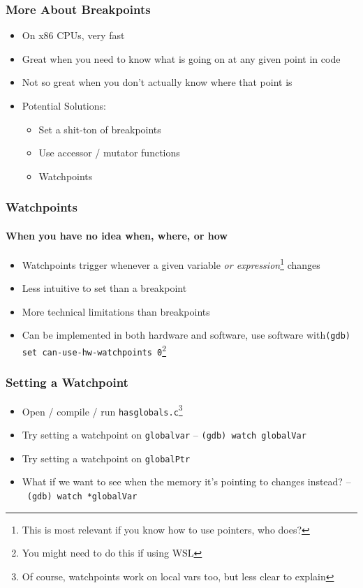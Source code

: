 \documentclass[aspectratio=169]{beamer}
\newcommand{\code}{\texttt}
\begin{document}
\begin{frame}
    \frametitle{More About Breakpoints}

    \begin{itemize}
        \item On x86 CPUs, very fast
        \item Great when you need to know what is going on at any given point in code
        \pause
        \item Not so great when you don't actually know where that point is
        \item Potential Solutions:
        \begin{itemize}
            \pause
            \item Set a shit-ton of breakpoints
            \item Use accessor / mutator functions
            \item Watchpoints
        \end{itemize}
    \end{itemize}

\end{frame}
\begin{frame}
    \frametitle{Watchpoints}
    \framesubtitle{When you have no idea when, where, or how}
    \begin{itemize}
        \item Watchpoints trigger whenever a given variable \textit{or expression}\footnote[frame]{This is most relevant if you know how to use pointers, who does?} changes
        \item Less intuitive to set than a breakpoint
        \item More technical limitations than breakpoints
        \item Can be implemented in both hardware and software, use software with\linebreak\code{(gdb) set can-use-hw-watchpoints 0}\footnote[frame]{You might need to do this if using WSL}
    \end{itemize}
\end{frame}
\begin{frame}
    \frametitle{Setting a Watchpoint}
    \begin{itemize}
        \item Open / compile / run \code{hasglobals.c}\footnote[]{Of course, watchpoints work on local vars too, but less clear to explain}
        \item Try setting a watchpoint on \code{globalvar} \pause -- \code{(gdb) watch globalVar}
        \item Try setting a watchpoint on \code{globalPtr}
        \pause
        \item What if we want to see when the memory it's pointing to changes instead? \pause --~\code{(gdb) watch *globalVar}
    \end{itemize}
\end{frame}
\end{document}
